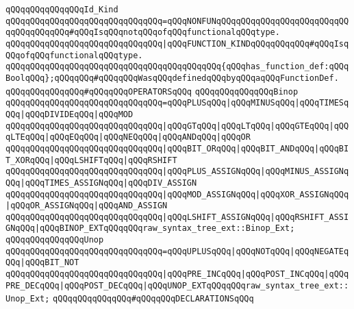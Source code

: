 \verb|qQQqqQQqqQQqqQQqId_Kind|\newline
\verb|qQQqqQQqqQQqqQQqqQQqqQQqqQQqqQQq=qQQqNONFUNqQQqqQQqqQQqqQQqqQQqqQQqqQQqqQQqqQQqqQQq#qQQqIsqQQqnotqQQqofqQQqfunctionalqQQqtype.|\newline
\verb|qQQqqQQqqQQqqQQqqQQqqQQqqQQqqQQq|\verb#|qQQqFUNCTION_KINDqQQqqQQqqQQq#\verb|#qQQqIsqQQqofqQQqfunctionalqQQqtype.|\newline
\verb|qQQqqQQqqQQqqQQqqQQqqQQqqQQqqQQqqQQqqQQqqQQq{qQQqhas_function_def:qQQqBoolqQQq};qQQqqQQq#qQQqqQQqWasqQQqdefinedqQQqbyqQQqaqQQqFunctionDef.|\newline
\newline
\verb|qQQqqQQqqQQqqQQq#qQQqqQQqOPERATORSqQQq|\newline
\verb|qQQqqQQqqQQqqQQqBinop|\newline
\verb|qQQqqQQqqQQqqQQqqQQqqQQqqQQqqQQq=qQQqPLUSqQQq|\verb#|qQQqMINUSqQQq|qQQqTIMESqQQq|qQQqDIVIDEqQQq|qQQqMOD#\newline
\verb|qQQqqQQqqQQqqQQqqQQqqQQqqQQqqQQq|\verb#|qQQqGTqQQq|qQQqLTqQQq|qQQqGTEqQQq|qQQqLTEqQQq|qQQqEQqQQq|qQQqNEQqQQq|qQQqANDqQQq|qQQqOR#\newline
\verb|qQQqqQQqqQQqqQQqqQQqqQQqqQQqqQQq|\verb#|qQQqBIT_ORqQQq|qQQqBIT_ANDqQQq|qQQqBIT_XORqQQq|qQQqLSHIFTqQQq|qQQqRSHIFT#\newline
\verb|qQQqqQQqqQQqqQQqqQQqqQQqqQQqqQQq|\verb#|qQQqPLUS_ASSIGNqQQq|qQQqMINUS_ASSIGNqQQq|qQQqTIMES_ASSIGNqQQq|qQQqDIV_ASSIGN#\newline
\verb|qQQqqQQqqQQqqQQqqQQqqQQqqQQqqQQq|\verb#|qQQqMOD_ASSIGNqQQq|qQQqXOR_ASSIGNqQQq|qQQqOR_ASSIGNqQQq|qQQqAND_ASSIGN#\newline
\verb|qQQqqQQqqQQqqQQqqQQqqQQqqQQqqQQq|\verb#|qQQqLSHIFT_ASSIGNqQQq|qQQqRSHIFT_ASSIGNqQQq|qQQqBINOP_EXTqQQqqQQqraw_syntax_tree_ext::Binop_Ext;#\newline
\newline
\verb|qQQqqQQqqQQqqQQqUnop|\newline
\verb|qQQqqQQqqQQqqQQqqQQqqQQqqQQqqQQq=qQQqUPLUSqQQq|\verb#|qQQqNOTqQQq|qQQqNEGATEqQQq|qQQqBIT_NOT#\newline
\verb|qQQqqQQqqQQqqQQqqQQqqQQqqQQqqQQq|\verb#|qQQqPRE_INCqQQq|qQQqPOST_INCqQQq|qQQqPRE_DECqQQq|qQQqPOST_DECqQQq|qQQqUNOP_EXTqQQqqQQqraw_syntax_tree_ext::Unop_Ext;#\newline
\newline
\newline
\verb|qQQqqQQqqQQqqQQq#qQQqqQQqDECLARATIONSqQQq|\newline
\newline
